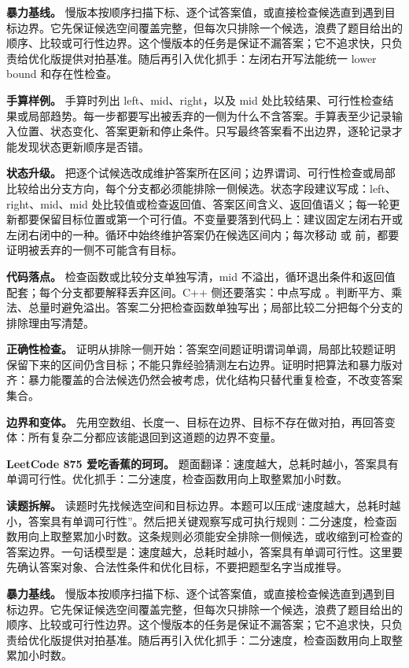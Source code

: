 \textbf{暴力基线。} 慢版本按顺序扫描下标、逐个试答案值，或直接检查候选直到遇到目标边界。它先保证候选空间覆盖完整，但每次只排除一个候选，浪费了题目给出的顺序、比较或可行性边界。这个慢版本的任务是保证不漏答案；它不追求快，只负责给优化版提供对拍基准。随后再引入优化抓手：左闭右开写法能统一 lower bound 和存在性检查。

\textbf{手算样例。} 手算时列出 left、mid、right，以及 mid 处比较结果、可行性检查结果或局部趋势。每一步都要写出被丢弃的一侧为什么不含答案。手算表至少记录输入位置、状态变化、答案更新和停止条件。只写最终答案看不出边界，逐轮记录才能发现状态更新顺序是否错。

\textbf{状态升级。} 把逐个试候选改成维护答案所在区间；边界谓词、可行性检查或局部比较给出分支方向，每个分支都必须能排除一侧候选。状态字段建议写成：left、right、mid、mid 处比较值或检查返回值、答案区间含义、返回值语义；每一轮更新都要保留目标位置或第一个可行值。不变量要落到代码上：建议固定左闭右开或左闭右闭中的一种。循环中始终维护答案仍在候选区间内；每次移动  或  前，都要证明被丢弃的一侧不可能含有目标。

\textbf{代码落点。} 检查函数或比较分支单独写清，mid 不溢出，循环退出条件和返回值配套；每个分支都要解释丢弃区间。C++ 侧还要落实：中点写成 。判断平方、乘法、总量时避免溢出。答案二分把检查函数单独写出；局部比较二分把每个分支的排除理由写清楚。

\textbf{正确性检查。} 证明从排除一侧开始：答案空间题证明谓词单调，局部比较题证明保留下来的区间仍含目标；不能只靠经验猜测左右边界。证明时把算法和暴力版对齐：暴力能覆盖的合法候选仍然会被考虑，优化结构只替代重复检查，不改变答案集合。

\textbf{边界和变体。} 先用空数组、长度一、目标在边界、目标不存在做对拍，再回答变体：所有复杂二分都应该能退回到这道题的边界不变量。

\noindent\textbf{LeetCode 875 爱吃香蕉的珂珂。} 题面翻译：速度越大，总耗时越小，答案具有单调可行性。优化抓手：二分速度，检查函数用向上取整累加小时数。

\textbf{读题拆解。} 读题时先找候选空间和目标边界。本题可以压成“速度越大，总耗时越小，答案具有单调可行性”。然后把关键观察写成可执行规则：二分速度，检查函数用向上取整累加小时数。这条规则必须能安全排除一侧候选，或收缩到可检查的答案边界。一句话模型是：速度越大，总耗时越小，答案具有单调可行性。这里要先确认答案对象、合法性条件和优化目标，不要把题型名字当成推导。

\textbf{暴力基线。} 慢版本按顺序扫描下标、逐个试答案值，或直接检查候选直到遇到目标边界。它先保证候选空间覆盖完整，但每次只排除一个候选，浪费了题目给出的顺序、比较或可行性边界。这个慢版本的任务是保证不漏答案；它不追求快，只负责给优化版提供对拍基准。随后再引入优化抓手：二分速度，检查函数用向上取整累加小时数。

